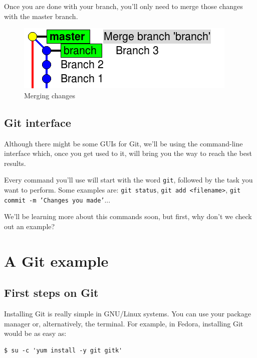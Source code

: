 \documentclass[a4paper,10pt]{article}
\newenvironment{terminal}
  {
    \vspace{+10pt}
    \begin{center}
    \begin{minipage}{0.95\textwidth}
    \begin{framed}
  }
  {
    \end{framed}
    \end{minipage}
    \end{center}
    \vspace{+10pt}
  }
\begin{document}
Once you are done with your branch, you'll only need to merge those
changes with the master branch.

\begin{figure}[h]
  \begin{center}
    \includegraphics[scale=0.5]{branching-04}
  \end{center}
  \caption{Merging changes}
\end{figure}

\subsection{Git interface}

Although there might be some GUIs for Git, we'll be using the
command-line interface which, once you get used to it, will bring you
the way to reach the best results.

Every command you'll use will start with the word \texttt{git}, followed
by the task you want to perform. Some examples are:
\texttt{git status},
\texttt{git add <filename>},
\texttt{git commit -m 'Changes you made'}...

We'll be learning more about this commands soon, but first, why don't we
check out an example?

\section{A Git example}

\subsection{First steps on Git}

Installing Git is really simple in GNU/Linux systems. You can use your
package manager or, alternatively, the terminal. For example, in
Fedora, installing Git would be as easy as:

\begin{terminal}
\begin{verbatim}
$ su -c 'yum install -y git gitk'
\end{verbatim}
\end{terminal}
\end{document}
